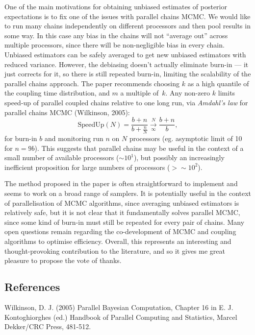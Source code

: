 \documentclass[11pt,a4paper]{article}
\begin{document}
One of the main motivations for obtaining unbiased estimates of posterior expectations is to fix one of the issues with parallel chains MCMC.
We would like to run many chains independently on different processors and then pool results in some way.
In this case any bias in the chains will not ``average out'' across multiple processors, since there will be non-negligible bias in every chain.
Unbiased estimators can be safely averaged to get new unbiased estimators with reduced variance.
However, the debiasing doesn't actually eliminate burn-in --- it just corrects for it, so there is still repeated burn-in, limiting the scalability of the parallel chains approach. The paper recommends choosing $k$ as a high quantile of the coupling time distribution, and $m$ a multiple of~$k$. Any non-zero $k$ limits speed-up of parallel coupled chains relative to one long run, via \emph{Amdahl's law} for parallel chains MCMC (Wilkinson, 2005):
    \[
\text{SpeedUp}(N) = \frac{b+n}{b+\frac{n}{N}} \overset{N}{\underset{\infty}{\longrightarrow}} \frac{b+n}{b},
    \]
    for burn-in $b$ and monitoring run $n$ on $N$ processors (eg. asymptotic limit of 10 for $n=9b$). This suggests that parallel chains may be useful in the context of a small number of available processors ($\sim 10^1$), but possibly an increasingly inefficient proposition for large numbers of processors ($>\sim 10^{2}$).

 The method proposed in the paper is often straightforward to implement and seems to work on a broad range of samplers.
It is potentially useful in the context of parallelisation of MCMC algorithms, since averaging unbiased estimators is relatively safe, but it is not clear that it fundamentally solves parallel MCMC, since some kind of burn-in must still be repeated for every pair of chains.
Many open questions remain regarding the co-development of MCMC and coupling algorithms to optimise efficiency.
Overall, this represents an interesting and thought-provoking contribution to the literature, and so it gives me great pleasure to propose the vote of thanks.

  \subsection*{References}

  \begin{description}
\item Wilkinson, D. J. (2005) Parallel Bayesian Computation, Chapter 16 in E. J. Kontoghiorghes (ed.) Handbook of Parallel Computing and Statistics, Marcel Dekker/CRC Press, 481-512.
    \end{description}
  
\end{document}
